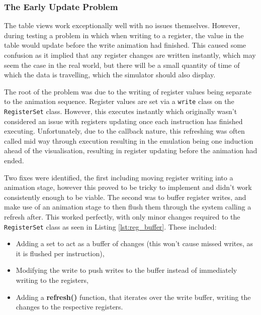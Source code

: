\subsubsection{The Early Update Problem}\label{sec:early_update_prob}
The table views work exceptionally well with no issues themselves. However, during testing a problem in which when writing to a register, the value in the table would update before the write animation had finished. This caused some confusion as it implied that any register changes are written instantly, which may seem the case in the real world, but there will be a small quantity of time of which the data is travelling, which the simulator should also display.

The root of the problem was due to the writing of register values being separate to the animation sequence. Register values are set via a \verb|write| class on the \texttt{RegisterSet} class. However, this executes instantly which originally wasn't considered an issue with registers updating once each instruction has finished executing. Unfortunately, due to the callback nature, this refreshing was often called mid way through execution resulting in the emulation being one induction ahead of the visualisation, resulting in register updating before the animation had ended.

Two fixes were identified, the first including moving register writing into a animation stage, however this proved to be tricky to implement and didn't work consistently enough to be viable. The second was to buffer register writes, and make use of an animation stage to then flush them through the system calling a refresh after. This worked perfectly, with only minor changes required to the \texttt{RegisterSet} class as seen in Listing \ref{lst:reg_buffer}. These included: 
\begin{itemize}
    \item Adding a set to act as a buffer of changes (this won't cause missed writes, as it is flushed per instruction),
    \item Modifying the write to push writes to the buffer instead of immediately writing to the registers,
    \item Adding a \textbf{refresh()} function, that iterates over the write buffer, writing the changes to the respective registers.
\end{itemize}

